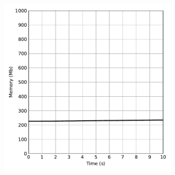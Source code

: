 \begin{figure}[htb]
\begin{subfigure}{.5\textwidth}
        \includegraphics[width=1.0\textwidth]{images/memory_with_rna.pdf}
    \end{subfigure}
    \label{fig:perf_with_rna}
\end{figure}

